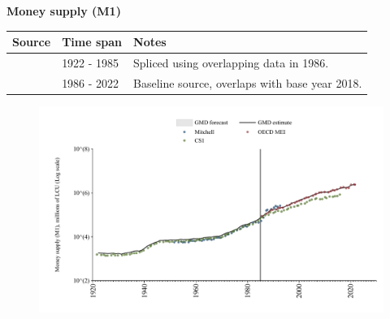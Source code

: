 \documentclass[12pt,a4paper,landscape]{article}
\begin{document}
\begin{adjustbox}{max totalsize={\paperwidth}{\paperheight},center}
\begin{minipage}[t][\textheight][t]{\textwidth}
\vspace*{0.5cm}
{}
\begin{center}
{\Large\bfseries Money supply (M1)}
\end{center}
\vspace{0.5cm}
\begin{table}[H]
\centering
\small
\begin{tabular}{|l|l|l|}
\hline
\textbf{Source} & \textbf{Time span} & \textbf{Notes} \\
\hline
\rowcolor{white}\cite{CS1_GBR}& 1922 - 1985 &Spliced using overlapping data in 1986. \\
\rowcolor{lightgray}\cite{OECD_MEI}& 1986 - 2022 &Baseline source, overlaps with base year 2018. \\
\hline
\end{tabular}
\end{table}
\begin{figure}[H]
\centering
\includegraphics[width=\textwidth,height=0.6\textheight,keepaspectratio]{graphs/GBR_M1.pdf}
\end{figure}
\end{minipage}
\end{adjustbox}
\end{document}
